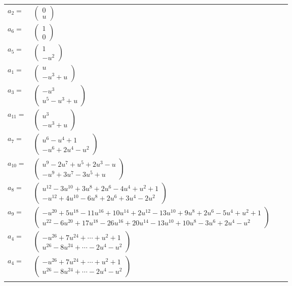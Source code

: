 \documentclass[1p]{elsarticle_modified}
\theoremstyle{definition}
\begin{document}
\begin{tabular}{m{7pt} m{180pt} m{7pt} m{180pt} }
\flushright $a_{2}=$&$\begin{pmatrix}0\\u\end{pmatrix}$ \\
\flushright $a_{6}=$&$\begin{pmatrix}1\\0\end{pmatrix}$ \\
\flushright $a_{5}=$&$\begin{pmatrix}1\\- u^2\end{pmatrix}$ \\
\flushright $a_{1}=$&$\begin{pmatrix}u\\- u^3+u\end{pmatrix}$ \\
\flushright $a_{3}=$&$\begin{pmatrix}- u^3\\u^5- u^3+u\end{pmatrix}$ \\
\flushright $a_{11}=$&$\begin{pmatrix}u^3\\- u^3+u\end{pmatrix}$ \\
\flushright $a_{7}=$&$\begin{pmatrix}u^6- u^4+1\\- u^6+2 u^4- u^2\end{pmatrix}$ \\
\flushright $a_{10}=$&$\begin{pmatrix}u^9-2 u^7+u^5+2 u^3- u\\- u^9+3 u^7-3 u^5+u\end{pmatrix}$ \\
\flushright $a_{8}=$&$\begin{pmatrix}u^{12}-3 u^{10}+3 u^8+2 u^6-4 u^4+u^2+1\\- u^{12}+4 u^{10}-6 u^8+2 u^6+3 u^4-2 u^2\end{pmatrix}$ \\
\flushright $a_{9}=$&$\begin{pmatrix}- u^{20}+5 u^{18}-11 u^{16}+10 u^{14}+2 u^{12}-13 u^{10}+9 u^8+2 u^6-5 u^4+u^2+1\\u^{22}-6 u^{20}+17 u^{18}-26 u^{16}+20 u^{14}-13 u^{10}+10 u^8-3 u^6+2 u^4- u^2\end{pmatrix}$ \\
\flushright $a_{4}=$&$\begin{pmatrix}- u^{26}+7 u^{24}+\cdots+u^2+1\\u^{26}-8 u^{24}+\cdots-2 u^4- u^2\end{pmatrix}$\\ \flushright $a_{4}=$&$\begin{pmatrix}- u^{26}+7 u^{24}+\cdots+u^2+1\\u^{26}-8 u^{24}+\cdots-2 u^4- u^2\end{pmatrix}$\\&\end{tabular}
\end{document}
